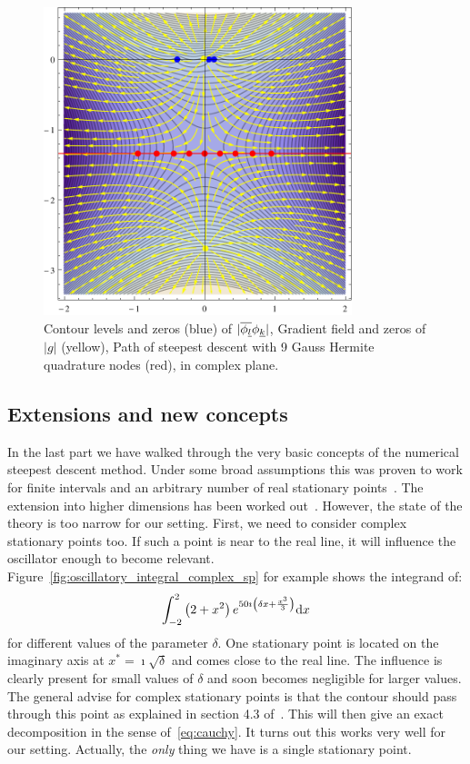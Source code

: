 \documentclass[a4paper,10pt]{article}
\begin{document}
\begin{figure}[h!]
  \centering
  \includegraphics[width=0.8\textwidth]{./fig/stationary_point_example.pdf}
  \caption{Contour levels and zeros (blue) of $|\overline{\phi_{\underline{l}}} \phi_{\underline{k}}|$,
  Gradient field and zeros of $|g|$ (yellow), Path of steepest descent with 9 Gauss Hermite
  quadrature nodes (red), in complex plane.}
  \label{fig:hawp_trafo_example}
\end{figure}


\subsection{Extensions and new concepts}


In the last part we have walked through the very basic concepts of the numerical steepest
descent method. Under some broad assumptions this was proven to work for finite intervals
and an arbitrary number of real stationary points~\cite{HV_hoq}. The extension into higher
dimensions has been worked out~\cite{HV_cub}.
However, the state of the theory is too narrow for our setting. First, we need to consider
complex stationary points too. If such a point is near to the real line, it will influence
the oscillator enough to become relevant. Figure~\ref{fig:oscillatory_integral_complex_sp}
for example shows the integrand of:
\begin{equation}\label{eq:nsd_csp_integral_example}
  \int_{-2}^{2} \left(2+x^2\right) e^{50 \imath \left(\delta x + \frac{x^3}{3}\right)} \mathrm{d}x
\end{equation}
for different values of the parameter $\delta$. One stationary point is located on the imaginary axis
at $x^{*} = \imath \sqrt{\delta}$ and comes close to the real line. The influence is clearly present
for small values of $\delta$ and soon becomes negligible for larger values.
The general advise for complex stationary points is that the contour should pass through
this point as explained in section 4.3 of~\cite{HV_hoq}. This will then give an exact
decomposition in the sense of~\eqref{eq:cauchy}. It turns out this works very well for our setting.
Actually, the \emph{only} thing we have is a single stationary point.
\end{document}
